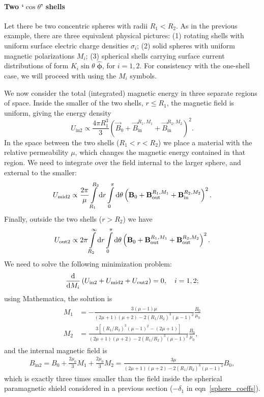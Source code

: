 \paragraph{Two `$\cos\theta$' shells}

Let there be two concentric spheres with radii $R_1<R_2$. As in the
previous example, there are three equivalent physical pictures: (1) rotating
shells with uniform surface electric charge densities $\sigma_i$; (2)
solid spheres with uniform magnetic polarizations $M_i$; (3) spherical
shells carrying surface current distributions of form
$K_i\sin\theta\;\hat{\boldsymbol\phi}$, for $i=1,2$. For consistency with the
one-shell case, we will proceed with using the $M_i$ symbols.

We now consider the total (integrated) magnetic energy in three separate regions
of space. Inside the smaller of the two shells, $r\leq R_1$, the magnetic field
is uniform, giving the energy density
%
\[
   U_\text{in2}\propto\frac{4\pi R_1^3}{3}\left(\vec B_0+\vec
   B_\text{in}^{R_1,M_1}+\vec B_\text{in}^{R_2,M_2}\right)^2.
\]
%
In the space between the two shells ($R_1<r<R_2$) we place a material
with the relative permeability $\mu$, which changes the magnetic
energy contained in that region. We need to integrate over the field internal to
the larger sphere, and external to the smaller:
%
\begin{align}
   \label{Uinternal}
   U_\text{mid2}\propto
   \frac{2\pi}{\mu}\int\limits_{R_1}^{R_2}\mathrm{d} r
   \int\limits_0^\pi\mathrm{d}\theta
   \left(\mathbf{B}_0+\mathbf{B}_\text{out}^{R_1,M_1}+\mathbf{B}_\text{in}^{R_2,M_2}\right)^2.
\end{align}
%
Finally, outside the two shells ($r>R_2$) we have
%
\[
   U_\text{out2}\propto
   2\pi\int\limits_{R_2}^\infty\mathrm{d} r
   \int\limits_0^\pi\mathrm{d}\theta
   \left(\mathbf{B}_0+\mathbf{B}_\text{out}^{R_1,M_1}+\mathbf{B}_\text{out}^{R_2,M_2}\right)^2.
\]
%
We need to solve the following minimization problem:
%
\[
   \frac{\mathrm{d}}{\mathrm{d}
   M_i}\left(U_\text{in2}+U_\text{mid2}+U_\text{out2}\right)=0,\quad i=1,2;
\]
%
using Mathematica, the solution is
%
\begin{align}
   \label{magnetization_two_shells}
\begin{split}
   M_1&=-\frac{3(\mu-1)\mu}{(2\mu+1)(\mu+2)-2(R_1/R_2)^3(\mu-1)^2}\frac{B_0}{\mu_0}\\[10pt]
   M_2&=\frac{3\left[(R_1/R_2)^3(\mu-1)^2-(2\mu+1)\right]}{(2\mu+1)(\mu+2)-2(R_1/R_2)^3(\mu-1)^2}\frac{B_0}{\mu_0},
\end{split}
\end{align}
%
and the internal magnetic field is \cite[cf.\ eqn~5.121]{jackson1998classical}
%
\begin{align}
   \label{sphere_shielding}
   B_\text{in2}=
   B_0+\frac{2\mu_0}{3}M_1+\frac{2\mu_0}{3}M_2
   =\frac{3\mu}{(2\mu+1)(\mu+2)-2(R_1/R_2)^3(\mu-1)^2}B_0,
\end{align}
%
which is exactly three times smaller than the field inside the spherical
paramagnetic shield considered in a previous section ($-\delta_1$ in
eqn~\ref{sphere_coeffs}).

